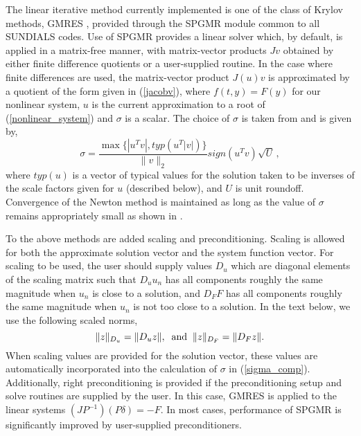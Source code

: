 The linear iterative method currently implemented is one of the class of 
Krylov methods, GMRES \cite{BrHi:89,SaSc:86}, 
provided through the SPGMR module common to all SUNDIALS codes. 
Use of SPGMR provides a linear solver which, by default, is applied in a 
matrix-free manner, with matrix-vector products $Jv$ obtained by either 
finite difference quotients or a user-supplied routine.
In the case where finite differences are used, 
the matrix-vector product $J(u)v$ is approximated by a quotient of the form
given in (\ref{jacobv}),
where $f(t, y) = F(y)$ for our nonlinear system, 
$u$ is the current approximation to a root of (\ref{nonlinear_system}) 
and $\sigma$ is a scalar.  The choice of $\sigma$ is taken from 
\cite{BrSa:90} and is given by,
\begin{equation}\label{sigma_comp}
  \sigma = \frac{\max \{|u^T v|, typ(u^T |v|)\}}{\|v\|_2} 
  sign(u^T v) \sqrt{U} \, ,
\end{equation}
where $typ(u)$ is a vector of typical values for the solution
taken to be inverses of the scale factors given for $u$ (described 
below), and $U$ is unit roundoff.
Convergence of the Newton method is maintained as long as the value
of $\sigma$ remains appropriately small as shown in \cite{Bro:87}.

To the above methods are added scaling and preconditioning. Scaling is allowed
for both the approximate solution vector and the system function vector.
For scaling to be used, the user should supply values $D_u$ which
are diagonal elements of the scaling matrix such that $D_u u_n$ has all
components roughly the same magnitude when $u_n$ is close to a solution,
and $D_F F$ has all components roughly the same magnitude when $u_n$ is not
too close to a solution.
In the text below, we use the following scaled norms,
\begin{equation}
\|z\|_{D_u} = \|D_u z\|, \;\; {\rm and} \;\; \|z\|_{D_F} = \|D_F z\|.
\end{equation}
When scaling values are provided for the solution vector, these values are 
automatically incorporated into the calculation of $\sigma$ in
(\ref{sigma_comp}).
Additionally, right preconditioning is provided if the preconditioning 
setup and solve routines are supplied by the user.  In this case,
GMRES is applied to the linear systems $(JP^{-1})(P\delta) = -F$.
In most cases, performance of SPGMR is significantly improved by user-supplied 
preconditioners.  

